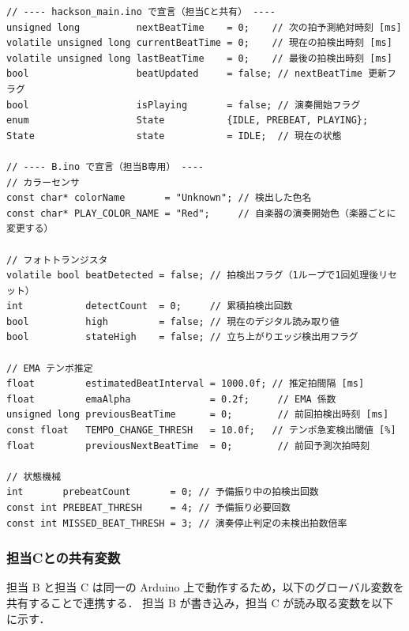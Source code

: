 \begin{lstlisting}[caption=担当 B 主要変数（B.ino / hackson\_main.ino）]
// ---- hackson_main.ino で宣言（担当Cと共有） ----
unsigned long          nextBeatTime    = 0;    // 次の拍予測絶対時刻 [ms]
volatile unsigned long currentBeatTime = 0;    // 現在の拍検出時刻 [ms]
volatile unsigned long lastBeatTime    = 0;    // 最後の拍検出時刻 [ms]
bool                   beatUpdated     = false; // nextBeatTime 更新フラグ
bool                   isPlaying       = false; // 演奏開始フラグ
enum                   State           {IDLE, PREBEAT, PLAYING};
State                  state           = IDLE;  // 現在の状態

// ---- B.ino で宣言（担当B専用） ----
// カラーセンサ
const char* colorName       = "Unknown"; // 検出した色名
const char* PLAY_COLOR_NAME = "Red";     // 自楽器の演奏開始色（楽器ごとに変更する）

// フォトトランジスタ
volatile bool beatDetected = false; // 拍検出フラグ（1ループで1回処理後リセット）
int           detectCount  = 0;     // 累積拍検出回数
bool          high         = false; // 現在のデジタル読み取り値
bool          stateHigh    = false; // 立ち上がりエッジ検出用フラグ

// EMA テンポ推定
float         estimatedBeatInterval = 1000.0f; // 推定拍間隔 [ms]
float         emaAlpha              = 0.2f;     // EMA 係数
unsigned long previousBeatTime      = 0;        // 前回拍検出時刻 [ms]
const float   TEMPO_CHANGE_THRESH   = 10.0f;   // テンポ急変検出閾値 [%]
float         previousNextBeatTime  = 0;        // 前回予測次拍時刻

// 状態機械
int       prebeatCount       = 0; // 予備振り中の拍検出回数
const int PREBEAT_THRESH     = 4; // 予備振り必要回数
const int MISSED_BEAT_THRESH = 3; // 演奏停止判定の未検出拍数倍率
\end{lstlisting}

\subsubsection{担当Cとの共有変数}

担当 B と担当 C は同一の Arduino 上で動作するため，以下のグローバル変数を共有することで連携する．
担当 B が書き込み，担当 C が読み取る変数を以下に示す．

